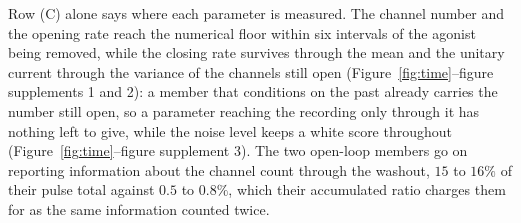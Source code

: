 Row (C) alone says where each parameter is measured. The channel number and the opening rate reach
the numerical floor within six intervals of the agonist being removed, while the closing rate
survives through the mean and the unitary current through the variance of the channels still open
(Figure~\ref{fig:time}--figure supplements 1 and 2): a member that conditions on the past already
carries the number still open, so a parameter reaching the recording only through it has nothing
left to give, while the noise level keeps a white score throughout
(Figure~\ref{fig:time}--figure supplement 3). The two open-loop members go on reporting
information about the channel count through the washout, $15$ to $16\%$ of their pulse total against
$0.5$ to $0.8\%$, which their accumulated ratio charges them for as the same information counted
twice.

